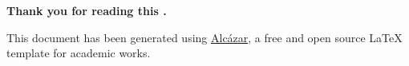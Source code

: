 % 
% 
% 




\newpage
\clearpage
\cleardoublepage

\thispagestyle{empty}

\vspace*{\fill}

\begin{center}
    \textbf{\large Thank you for reading this {\thesisType}.}
\end{center}

\vspace*{\fill}




\begingroup

    \begin{center}
    
        \renewcommand{\baselinestretch}{0.9}\footnotesize  %
        
        \noindent This document has been generated using {\href{https://github.com/dpmj/alcazar}{Alcázar}}, a free and open source {\LaTeX} template for academic works.

    \end{center}
\endgroup


